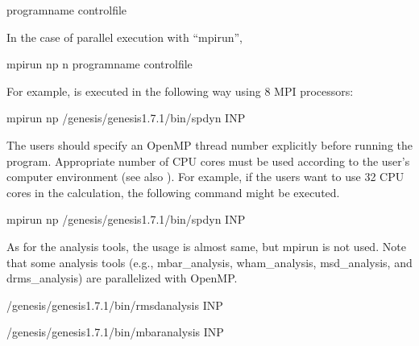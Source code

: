 \documentclass[a4paper,11pt,oneside,english]{sphinxmanual}
\begin{document}
\begin{sphinxVerbatim}[commandchars=\\\{\}]
\PYGZdl{} \PYG{o}{[}program\PYGZus{}name\PYG{o}{]} \PYG{o}{[}control\PYGZus{}file\PYG{o}{]}
\end{sphinxVerbatim}

In the case of parallel execution with “mpirun”,

\begin{sphinxVerbatim}[commandchars=\\\{\}]
\PYGZdl{} mpirun \PYGZhy{}np n \PYG{o}{[}program\PYGZus{}name\PYG{o}{]} \PYG{o}{[}control\PYGZus{}file\PYG{o}{]}
\end{sphinxVerbatim}

For example,  is executed in the following way using 8 MPI processors:

\begin{sphinxVerbatim}[commandchars=\\\{\}]
\PYGZdl{} mpirun \PYGZhy{}np  \PYGZti{}/genesis/genesis\PYGZhy{}1.7.1/bin/spdyn INP
\end{sphinxVerbatim}

The users should specify an OpenMP thread number explicitly before running the program.
Appropriate number of CPU cores must be used according to the user’s computer environment (see also {\hyperref[\detokenize{02_Available_Programs:available-programs}]{}}).
For example, if the users want to use 32 CPU cores in the calculation,
the following command might be executed.

\begin{sphinxVerbatim}[commandchars=\\\{\}]
\PYGZdl{}  
\PYGZdl{} mpirun \PYGZhy{}np  \PYGZti{}/genesis/genesis\PYGZhy{}1.7.1/bin/spdyn INP
\end{sphinxVerbatim}

As for the analysis tools, the usage is almost same, but mpirun is not used.
Note that some analysis tools (e.g., mbar\_analysis, wham\_analysis, msd\_analysis, and drms\_analysis) are
parallelized with OpenMP.

\begin{sphinxVerbatim}[commandchars=\\\{\}]
\PYGZdl{} \PYGZti{}/genesis/genesis\PYGZhy{}1.7.1/bin/rmsd\PYGZus{}analysis INP

\PYGZdl{}  
\PYGZdl{} \PYGZti{}/genesis/genesis\PYGZhy{}1.7.1/bin/mbar\PYGZus{}analysis INP
\end{sphinxVerbatim}
\end{document}
